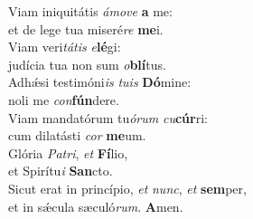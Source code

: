 \oddverse Viam iniquitátis \textit{á}\textit{mo}\textit{ve} \textbf{a} me:~\*\\
\oddverse et de lege tua miseré\textit{re} \textbf{me}i.\\
\evenverse Viam veri\textit{tá}\textit{tis} \textit{e}\textbf{lé}gi:~\*\\
\evenverse judícia tua non sum \textit{o}\textbf{blí}tus.\\
\oddverse Adhǽsi testimóni\textit{is} \textit{tu}\textit{is} \textbf{Dó}mine:~\*\\
\oddverse noli me \textit{con}\textbf{fún}dere.\\
\evenverse Viam mandatórum tu\textit{ó}\textit{rum} \textit{cu}\textbf{cúr}ri:~\*\\
\evenverse cum dilatásti \textit{cor} \textbf{me}um.\\
\oddverse Glória \textit{Pa}\textit{tri}, \textit{et} \textbf{Fí}lio,~\*\\
\oddverse et Spirítu\textit{i} \textbf{San}cto.\\
\evenverse Sicut erat in princípio, \textit{et} \textit{nunc}, \textit{et} \textbf{sem}per,~\*\\
\evenverse et in sǽcula sæculó\textit{rum}. \textbf{A}men.\\
